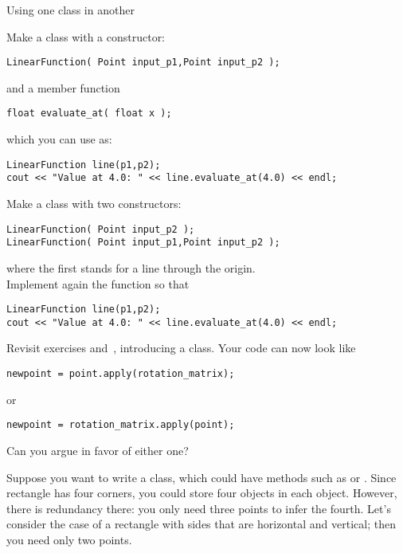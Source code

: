  {Using one class in another}
\label{sec:FuncHasPoint}
\label{sec:poly-rectangle}


\begin{exercise}
  \label{ex:geom:line}
  Make a class  with a constructor:
\begin{lstlisting}
LinearFunction( Point input_p1,Point input_p2 );
\end{lstlisting}
  and a member function
\begin{lstlisting}
float evaluate_at( float x );
\end{lstlisting}
  which you can use as:
\begin{lstlisting}
LinearFunction line(p1,p2);
cout << "Value at 4.0: " << line.evaluate_at(4.0) << endl;
\end{lstlisting}
\end{exercise}

\begin{exercise}
  \label{ex:geom:line2}
  Make a class  with two constructors:
\begin{lstlisting}
LinearFunction( Point input_p2 );
LinearFunction( Point input_p1,Point input_p2 );
\end{lstlisting}
where the first stands for a line through the origin.\\
Implement again the  function so that
\begin{lstlisting}
LinearFunction line(p1,p2);
cout << "Value at 4.0: " << line.evaluate_at(4.0) << endl;
\end{lstlisting}
\end{exercise}

\begin{exercise}
  \label{ex:pointrotate-matrix}
  Revisit exercises 
  and~, introducing a  class. Your
  code can now look like
\begin{lstlisting}
newpoint = point.apply(rotation_matrix);
\end{lstlisting}
  or
\begin{lstlisting}
newpoint = rotation_matrix.apply(point);
\end{lstlisting}
  Can you argue in favor of either one?
\end{exercise}

Suppose you want to write a  class, which could have methods such as
 or .
Since rectangle has four corners, you could store four 
objects in each  object. However, there is redundancy
there: you only need three points to infer the fourth. Let's consider
the case of a rectangle with sides that are horizontal and vertical;
then you need only two points.

